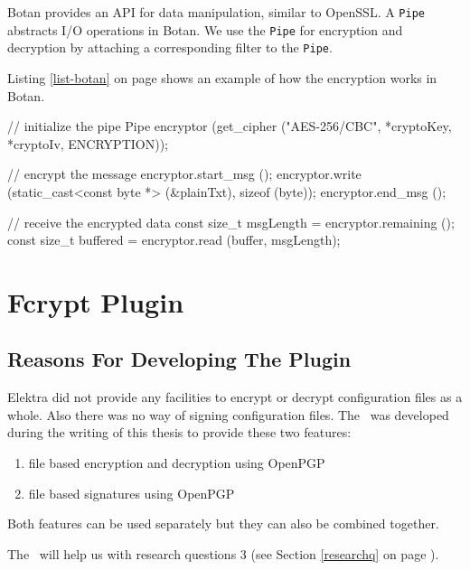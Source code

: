 Botan provides an API for data manipulation, similar to OpenSSL.
A \texttt{Pipe} abstracts I/O operations in Botan.
We use the \texttt{Pipe} for encryption and decryption by attaching a corresponding filter to the \texttt{Pipe}. 

Listing \ref{list-botan} on page \pageref{list-botan} shows an example of how the encryption works in Botan.

\begin{code}[label=list-botan,language=C++,caption={Encryption in the Botan crypto plugin variant}]
// initialize the pipe
Pipe encryptor (get_cipher ("AES-256/CBC", 
	*cryptoKey, *cryptoIv, ENCRYPTION));

// encrypt the message
encryptor.start_msg ();
encryptor.write (static_cast<const byte *> (&plainTxt), 
	sizeof (byte));
encryptor.end_msg ();

// receive the encrypted data
const size_t msgLength = encryptor.remaining ();
const size_t buffered = encryptor.read (buffer, msgLength);
\end{code}


\section{Fcrypt Plugin}
\label{fcrypt-plugin}

\subsection{Reasons For Developing The Plugin}

Elektra did not provide any facilities to encrypt or decrypt configuration files as a whole.
Also there was no way of signing configuration files.
The \fcrypt ~was developed during the writing of this thesis to provide these two features:
\begin{enumerate}
\item file based encryption and decryption using OpenPGP
\item file based signatures using OpenPGP
\end{enumerate}

Both features can be used separately but they can also be combined together.

The \fcrypt ~will help us with research questions 3 (see Section \ref{researchq} on page \pageref{researchq}).

